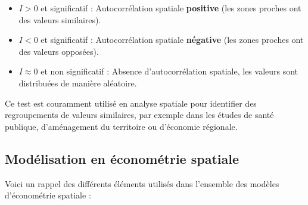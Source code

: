 \documentclass[
]{article}
\begin{document}
\begin{itemize}
    \item \( I > 0 \) et significatif : Autocorrélation spatiale \textbf{positive} (les zones proches ont des valeurs similaires).
    \item \( I < 0 \) et significatif : Autocorrélation spatiale \textbf{négative} (les zones proches ont des valeurs opposées).
    \item \( I \approx 0 \) et non significatif : Absence d’autocorrélation spatiale, les valeurs sont distribuées de manière aléatoire.
\end{itemize}

Ce test est couramment utilisé en analyse spatiale pour identifier des
regroupements de valeurs similaires, par exemple dans les études de
santé publique, d'aménagement du territoire ou d'économie régionale.

\hypertarget{moduxe9lisation-en-uxe9conomuxe9trie-spatiale}{%
\subsection{Modélisation en économétrie
spatiale}\label{moduxe9lisation-en-uxe9conomuxe9trie-spatiale}}

Voici un rappel des différents éléments utilisés dans l'ensemble des
modèles d'économétrie spatiale :
\end{document}

